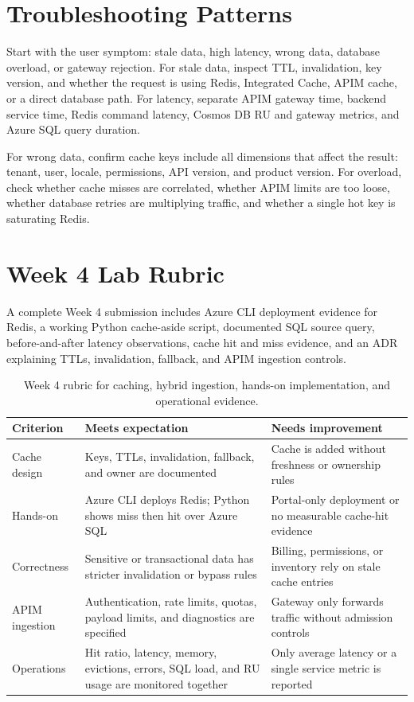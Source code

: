 \section{Troubleshooting Patterns}
Start with the user symptom: stale data, high latency, wrong data, database overload, or gateway rejection. For stale data, inspect TTL, invalidation, key version, and whether the request is using Redis, Integrated Cache, APIM cache, or a direct database path. For latency, separate APIM gateway time, backend service time, Redis command latency, Cosmos DB RU and gateway metrics, and Azure SQL query duration.

For wrong data, confirm cache keys include all dimensions that affect the result: tenant, user, locale, permissions, API version, and product version. For overload, check whether cache misses are correlated, whether APIM limits are too loose, whether database retries are multiplying traffic, and whether a single hot key is saturating Redis.

\section{Week 4 Lab Rubric}
A complete Week 4 submission includes Azure CLI deployment evidence for Redis, a working Python cache-aside script, documented SQL source query, before-and-after latency observations, cache hit and miss evidence, and an ADR explaining TTLs, invalidation, fallback, and APIM ingestion controls.

\begin{table}[H]
\centering
\small
\begin{tabular}{@{}p{3.0cm}p{5.0cm}p{5.0cm}@{}}
\toprule
\textbf{Criterion} & \textbf{Meets expectation} & \textbf{Needs improvement} \\
\midrule
Cache design & Keys, TTLs, invalidation, fallback, and owner are documented & Cache is added without freshness or ownership rules \\
Hands-on & Azure CLI deploys Redis; Python shows miss then hit over Azure SQL & Portal-only deployment or no measurable cache-hit evidence \\
Correctness & Sensitive or transactional data has stricter invalidation or bypass rules & Billing, permissions, or inventory rely on stale cache entries \\
APIM ingestion & Authentication, rate limits, quotas, payload limits, and diagnostics are specified & Gateway only forwards traffic without admission controls \\
Operations & Hit ratio, latency, memory, evictions, errors, SQL load, and RU usage are monitored together & Only average latency or a single service metric is reported \\
\bottomrule
\end{tabular}
\caption{Week 4 rubric for caching, hybrid ingestion, hands-on implementation, and operational evidence.}
\label{tab:week4-rubric}
\end{table}

